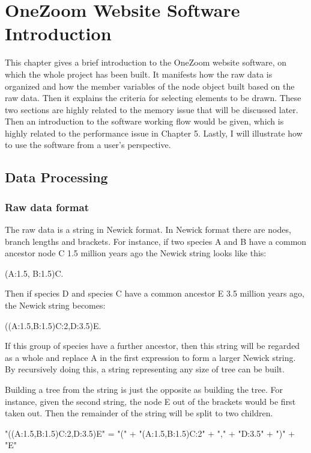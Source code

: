 \documentclass[MSc]{icldt}
\begin{document}
\chapter{OneZoom Website Software Introduction}

This chapter gives a brief introduction to the OneZoom website software, on which the whole project has been built. It manifests how the raw data is organized and how the member variables of the node object built based on the raw data. Then it explains the criteria for selecting elements to be drawn. These two sections are highly related to the memory issue that will be discussed later. Then an introduction to the software working flow would be given, which is highly related to the performance issue in Chapter 5. Lastly, I will illustrate how to use the software from a user's perspective.

\section{Data Processing}

\subsection{Raw data format}

The raw data is a string in Newick format. In Newick format there are nodes, branch lengths and brackets. For instance, if two species A and B have a common ancestor node C 1.5 million years ago the Newick string looks like this: 
\begin{center}
	(A:1.5, B:1.5)C. 
\end{center}

Then if species D and species C have a common ancestor E 3.5 million years ago, the Newick string becomes: 
\begin{center}
	((A:1.5,B:1.5)C:2,D:3.5)E. 
\end{center}
If this group of species have a further ancestor, then this string will be regarded as a whole and replace A in the first expression to form a larger Newick string. By recursively doing this, a string representing any size of tree can be built.

Building a tree from the string is just the opposite as building the tree. For instance, given the second string, the node E out of the brackets would be first taken out. Then the remainder of the string will be split to two children.

\begin{center}
	"((A:1.5,B:1.5)C:2,D:3.5)E" =  "(" + "(A:1.5,B:1.5)C:2" + "," + "D:3.5" + ")" + "E"
\end{center}
\end{document}
